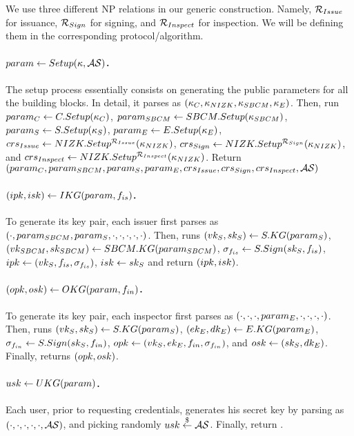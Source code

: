 We use three different NP relations in our generic construction. Namely,
$\mathcal{R}_{Issue}$ for issuance, $\mathcal{R}_{Sign}$ for signing, and
$\mathcal{R}_{Inspect}$ for inspection. We will be defining them in the
corresponding protocol/algorithm.


\paragraph{$param \gets Setup(\kappa,\mathcal{AS})$.} %
The setup process essentially consists on generating the public parameters
for all the building blocks. In detail, it parses \secpar as $(\kappa_{C},
\kappa_{NIZK},\kappa_{SBCM},\kappa_{E})$. Then, run $param_C \gets
C.Setup(\kappa_{C})$, $param_{SBCM} \gets  SBCM.Setup(\kappa_{SBCM})$, $param_{S} \gets
S.Setup(\kappa_{S})$, $param_{E} \gets E.Setup(\kappa_{E})$, $crs_{Issue} \gets
NIZK.Setup^{\mathcal{R}_{Issue}}(\kappa_{NIZK})$, $crs_{Sign} \gets
NIZK.Setup^{\mathcal{R}_{Sign}}(\kappa_{NIZK})$, and $crs_{Inspect} \gets
NIZK.Setup^{\mathcal{R}_{Inspect}}(\kappa_{NIZK})$. Return $(param_C,param_{SBCM},
param_{S},param_{E},crs_{Issue},crs_{Sign},crs_{Inspect},
\mathcal{AS})$

\paragraph{$(ipk,isk) \gets IKG(param,f_{is})$.} %
To generate its key pair, each issuer first parses \parm as $(\cdot,param_{SBCM},
param_{S},\cdot,\cdot,\cdot,\cdot,\cdot)$. Then, runs $(vk_{S},sk_{S}) \gets
S.KG(param_{S})$, $(vk_{SBCM},sk_{SBCM}) \gets SBCM.KG(param_{SBCM})$,
$\sigma_{f_{is}} \gets S.Sign(sk_{S},f_{is})$, $ipk \gets (vk_{S},f_{is},
\sigma_{f_{is}})$, $isk \gets sk_{S}$ and return $(ipk,isk)$.

\paragraph{$(opk,osk) \gets OKG(param,f_{in})$.} %
To generate its key pair, each inspector first parses \parm as $(\cdot,\cdot,
\cdot,param_{E},\cdot,\cdot,\cdot,\cdot)$. Then, runs $(vk_{S},sk_{S}) \gets S.KG
(param_{S})$, $(ek_{E},dk_{E}) \gets E.KG(param_{E})$, $\sigma_{f_{in}} \gets S.Sign
(sk_{S},f_{in})$, $opk \gets (vk_{S},ek_{E},f_{in},\sigma_{f_{in}})$, and $osk \gets
(sk_{S},dk_{E})$. Finally, returns $(opk,osk)$.

\paragraph{$usk \gets UKG(param)$.} %
Each user, prior to requesting credentials, generates his secret key by parsing
\parm as $(\cdot,\cdot,\cdot,\cdot,\cdot,\mathcal{AS})$, and picking randomly
$usk \stackrel{\$}{\gets} \mathcal{AS}$. Finally, return \usk.

